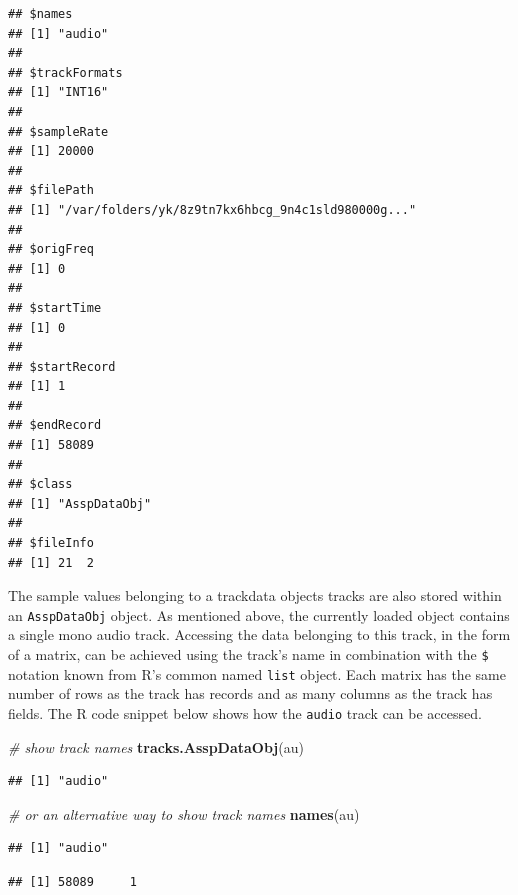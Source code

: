 \documentclass[]{book}
\newenvironment{Shaded}{\begin{snugshade}}{\end{snugshade}}
\newcommand{\CommentTok}[1]{\textcolor[rgb]{0.56,0.35,0.01}{\textit{#1}}}
\newcommand{\KeywordTok}[1]{\textcolor[rgb]{0.13,0.29,0.53}{\textbf{#1}}}
\newcommand{\NormalTok}[1]{#1}
\newcommand{\OperatorTok}[1]{\textcolor[rgb]{0.81,0.36,0.00}{\textbf{#1}}}
\theoremstyle{definition}
\theoremstyle{definition}
\theoremstyle{definition}
\theoremstyle{remark}
\begin{document}
\begin{verbatim}
## $names
## [1] "audio"
## 
## $trackFormats
## [1] "INT16"
## 
## $sampleRate
## [1] 20000
## 
## $filePath
## [1] "/var/folders/yk/8z9tn7kx6hbcg_9n4c1sld980000g..."
## 
## $origFreq
## [1] 0
## 
## $startTime
## [1] 0
## 
## $startRecord
## [1] 1
## 
## $endRecord
## [1] 58089
## 
## $class
## [1] "AsspDataObj"
## 
## $fileInfo
## [1] 21  2
\end{verbatim}

The sample values belonging to a trackdata objects tracks are also
stored within an \texttt{AsspDataObj} object. As mentioned above, the
currently loaded object contains a single mono audio track. Accessing
the data belonging to this track, in the form of a matrix, can be
achieved using the track's name in combination with the \texttt{\$}
notation known from R's common named \texttt{list} object. Each matrix
has the same number of rows as the track has records and as many columns
as the track has fields. The R code snippet below shows how the
\texttt{audio} track can be accessed.

\begin{Shaded}
\begin{Highlighting}[]
\CommentTok{# show track names}
\KeywordTok{tracks.AsspDataObj}\NormalTok{(au)}
\end{Highlighting}
\end{Shaded}

\begin{verbatim}
## [1] "audio"
\end{verbatim}

\begin{Shaded}
\begin{Highlighting}[]
\CommentTok{# or an alternative way to show track names}
\KeywordTok{names}\NormalTok{(au)}
\end{Highlighting}
\end{Shaded}

\begin{verbatim}
## [1] "audio"
\end{verbatim}

\begin{Shaded}
\end{Shaded}

\begin{verbatim}
## [1] 58089     1
\end{verbatim}
\end{document}
